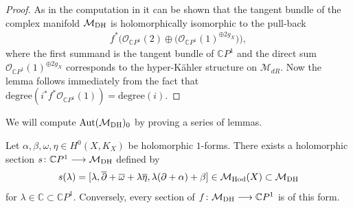 \begin{proof} As in the computation in \cite[pp.~555--556]{HKLR} it can be shown that the tangent bundle of the complex manifold ${\mathcal M}_{\rm DH}$ is holomorphically isomorphic to the pull-back
\begin{gather*}f^*\big({\mathcal O}_{{\mathbb C}P^1}(2)\oplus \big({\mathcal O}_{{\mathbb C}P^1}(1)^{\oplus 2g_X}\big)\big) ,\end{gather*}
where the f\/irst summand is the tangent bundle of $\mathbb CP^1$ and the direct sum ${\mathcal O}_{{\mathbb C}P^1}(1)^{\oplus 2g_X}$ corresponds to the hyper-K\"ahler structure on $\mathcal M_{dR}$. Now the lemma follows immediately from the fact that $\text{degree}(i^*f^*{\mathcal O}_{{\mathbb
C}P^1}(1)) = \text{degree}(i)$.
\end{proof}

We will compute $\operatorname{Aut}(\mathcal M_{\rm DH})_0$ by proving a series of lemmas.
\begin{Lemma}\label{sections}
Let $\alpha, \beta, \omega, \eta \in H^0(X, K_X)$ be holomorphic $1$-forms. There exists a holomorphic section $s \colon {\mathbb C}P^1 \longrightarrow {\mathcal M}_{\rm DH}$ defined by
\begin{gather*}s(\lambda) = [\lambda, \overline{\partial}+\overline{\omega}+\lambda\overline{\eta}, \lambda(\partial+\alpha)+\beta] \in \mathcal M_{\rm Hod}(X)
 \subset {\mathcal M}_{\rm DH}\end{gather*}
for $\lambda \in {\mathbb C} \subset \mathbb CP^1$. Conversely, every section of $f \colon {\mathcal M}_{\rm DH} \longrightarrow {\mathbb C}P^1 $ is of this form.
\end{Lemma}

